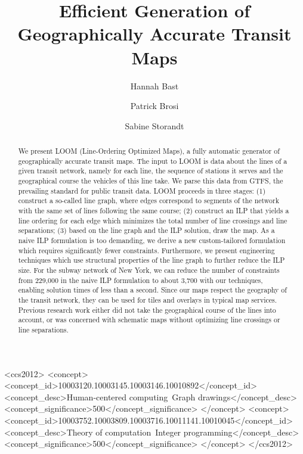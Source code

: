 \documentclass[format=acmsmall, review=false, screen=true]{acmart}
\begin{document}
\title{Efficient Generation of Geographically Accurate Transit Maps}

\author{Hannah Bast}

\author{Patrick Brosi}

\author{Sabine Storandt}

\begin{abstract}
We present LOOM (Line-Ordering Optimized Maps), a fully automatic generator of geographically accurate transit maps.
The input to LOOM is data about the lines of a given transit network, namely for each line, the sequence of stations it serves and the geographical course the vehicles of this line take. We parse this data from GTFS, the prevailing standard for public transit data.
LOOM proceeds in three stages:
	(1) construct a so-called line graph, where edges correspond to segments of the network with the same set of lines following the same course;
	(2) construct an ILP that yields a line ordering for each edge which minimizes the total number of line crossings and line separations;
	(3) based on the line graph and the ILP solution, draw the map.
As a naive ILP formulation is too demanding, we derive a new custom-tailored formulation which requires significantly fewer constraints. Furthermore, we present engineering techniques which use structural properties of the line graph to further reduce the ILP size. For the subway network of New York, we can reduce the number of constraints from 229,000 in the naive ILP formulation to about 3,700 with our techniques, enabling solution times of less than a second. Since our maps respect the geography of the transit network, they can be used for tiles and overlays in typical map services. Previous research work either did not take the geographical course of the lines into account, or was concerned with schematic maps without optimizing line crossings or line separations.
\end{abstract}

\def\UrlFont{\normalsize}

%
%
\begin{CCSXML}
<ccs2012>
<concept>
<concept_id>10003120.10003145.10003146.10010892</concept_id>
<concept_desc>Human-centered computing~Graph drawings</concept_desc>
<concept_significance>500</concept_significance>
</concept>
<concept>
<concept_id>10003752.10003809.10003716.10011141.10010045</concept_id>
<concept_desc>Theory of computation~Integer programming</concept_desc>
<concept_significance>500</concept_significance>
</concept>
</ccs2012>
\end{CCSXML}
\end{document}
